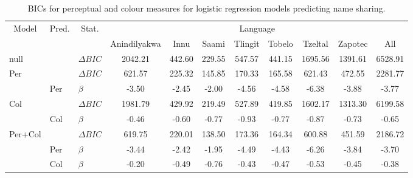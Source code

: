 \begin{table}[!h]
\centering
\caption{\label{tab:table:resultsLR}BICs for perceptual and colour measures for logistic regression models predicting name sharing.}
\centering
\begin{tabular}[t]{lllcccccccc}
\toprule
\multicolumn{1}{c}{Model} & \multicolumn{1}{c}{Pred.} & \multicolumn{1}{c}{Stat.} & \multicolumn{8}{c}{Language} \\
\cmidrule(l{3pt}r{3pt}){1-1} \cmidrule(l{3pt}r{3pt}){2-2} \cmidrule(l{3pt}r{3pt}){3-3} \cmidrule(l{3pt}r{3pt}){4-11}
  &    &     & Anindilyakwa & Innu & Saami & Tlingit & Tobelo & Tzeltal & Zapotec & All\\
\midrule
null &  & $\Delta BIC$ & 2042.21 & 442.60 & 229.55 & 547.57 & 441.15 & 1695.56 & 1391.61 & 6528.91\\
Per &  & $\Delta BIC$ & 621.57 & 225.32 & 145.85 & 170.33 & 165.58 & 621.43 & 472.55 & 2281.77\\
 & Per & $\beta$ & -3.50 & -2.45 & -2.00 & -4.56 & -4.58 & -6.38 & -3.88 & -3.77\\
Col &  & $\Delta BIC$ & 1981.79 & 429.92 & 219.49 & 527.89 & 419.85 & 1602.17 & 1313.30 & 6199.58\\
 & Col & $\beta$ & -0.46 & -0.60 & -0.77 & -0.93 & -0.77 & -0.87 & -0.73 & -0.65\\
Per+Col &  & $\Delta BIC$ & 619.75 & 220.01 & 138.50 & 173.36 & 164.34 & 600.88 & 451.59 & 2186.72\\
 & Per & $\beta$ & -3.44 & -2.42 & -1.95 & -4.49 & -4.43 & -6.26 & -3.84 & -3.70\\
 & Col & $\beta$ & -0.20 & -0.49 & -0.76 & -0.43 & -0.47 & -0.53 & -0.45 & -0.38\\
\bottomrule
\end{tabular}
\end{table}
